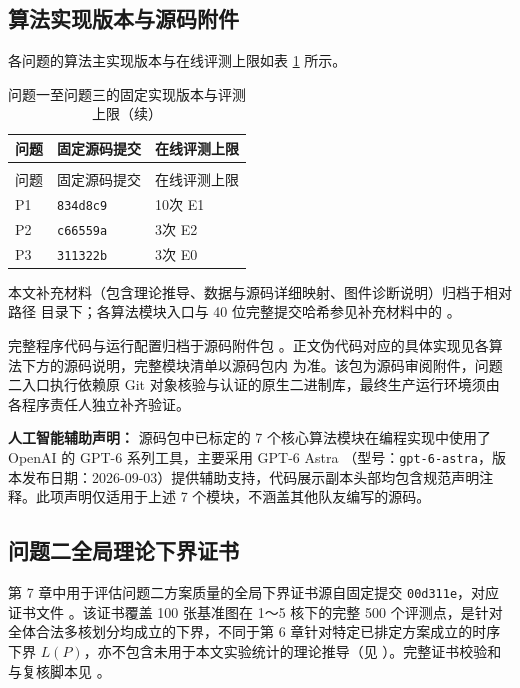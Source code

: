 \documentclass[anonymous,withtoc]{gmcm2026}
\begin{document}
\subsection{算法实现版本与源码附件}

各问题的算法主实现版本与在线评测上限如表 \ref{tab:appendix-1} 所示。



{\def\LTcaptype{table} %
\begin{longtable}[]{@{}lll@{}}
\caption{问题一至问题三的固定实现版本与评测上限}\label{tab:appendix-1}\\
\toprule\noalign{}
问题 & 固定源码提交 & 在线评测上限 \\
\midrule\noalign{}
\endfirsthead
\caption[]{问题一至问题三的固定实现版本与评测上限（续）}\\
\toprule\noalign{}
问题 & 固定源码提交 & 在线评测上限 \\
\midrule\noalign{}
\endhead
\bottomrule\noalign{}
\endlastfoot
P1 & \texttt{834d8c9} & 10次 E1 \\
P2 & \texttt{c66559a} & 3次 E2 \\
P3 & \texttt{311322b} & 3次 E0 \\
\end{longtable}
}

本文补充材料（包含理论推导、数据与源码详细映射、图件诊断说明）归档于相对路径 \texttt{} 目录下；各算法模块入口与 40 位完整提交哈希参见补充材料中的 \texttt{}。

完整程序代码与运行配置归档于源码附件包 \texttt{}。正文伪代码对应的具体实现见各算法下方的源码说明，完整模块清单以源码包内 \texttt{} 为准。该包为源码审阅附件，问题二入口执行依赖原 Git 对象核验与认证的原生二进制库，最终生产运行环境须由各程序责任人独立补齐验证。

\textbf{人工智能辅助声明：} 源码包中已标定的 7 个核心算法模块在编程实现中使用了 OpenAI 的 GPT-6 系列工具，主要采用 GPT-6 Astra \cite{openai-gpt6-astra}（型号：\texttt{gpt-6-astra}，版本发布日期：2026-09-03）提供辅助支持，代码展示副本头部均包含规范声明注释。此项声明仅适用于上述 7 个模块，不涵盖其他队友编写的源码。

\subsection{问题二全局理论下界证书}

第 7 章中用于评估问题二方案质量的全局下界证书源自固定提交 \texttt{00d311e}，对应证书文件 \texttt{}。该证书覆盖 100 张基准图在 1～5 核下的完整 500 个评测点，是针对全体合法多核划分均成立的下界，不同于第 6 章针对特定已排定方案成立的时序下界 \(L(P)\)，亦不包含未用于本文实验统计的理论推导（见 \texttt{}）。完整证书校验和与复核脚本见 \texttt{}。
\end{document}
